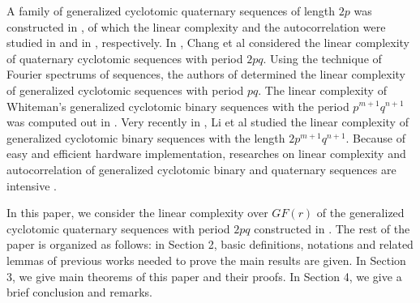 \documentclass{mcom-l}
\theoremstyle{definition}
\numberwithin{equation}{section}
\begin{document}
A family of generalized cyclotomic quaternary sequences of length $ 2p $ was constructed in \cite{B11}, of which the linear complexity and the autocorrelation were studied in \cite{B10} and in \cite{B12}, respectively. In \cite{B13}, Chang et al  considered the linear complexity of quaternary cyclotomic sequences with period $ 2pq $.  Using the technique of Fourier spectrums of  sequences, the authors of \cite{B14} determined the linear complexity of generalized cyclotomic sequences with period $ pq $. The linear complexity of Whiteman\textquoteright s generalized cyclotomic binary sequences with the period $p^{m+1}q^{n+1}$ was computed out in \cite{B20}. Very recently in \cite[June 2015]{B21}, Li et al studied the linear complexity of generalized cyclotomic binary sequences with the length $2p^{m+1}q^{n+1}$. Because of easy and efficient hardware implementation, researches on  linear complexity and autocorrelation of generalized cyclotomic binary and quaternary sequences are intensive \cite{B7,B8,B9,B15,B16,B17}.

 In this paper, we consider the linear complexity over $ GF(r) $ of the generalized cyclotomic quaternary sequences with period $ 2pq $ constructed in \cite{B13}. The rest of the paper is organized as follows: in Section 2, basic definitions, notations  and related  lemmas of previous works needed to prove the main results are given. In Section 3, we give main theorems of this paper and their proofs. In Section 4, we give a brief conclusion and remarks.
 
\end{document}
